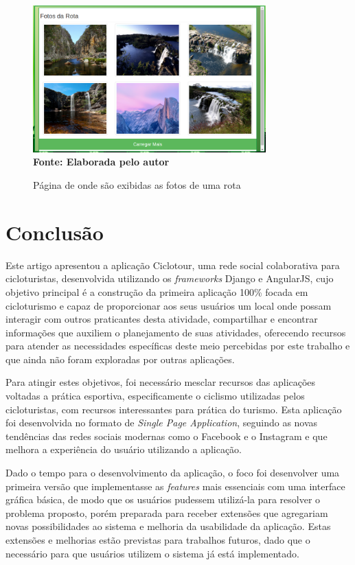 \begin{figure}[!ht]
	\centering	
	\caption[\hspace{0.1cm} Fotos da Rota.]
	{Página de onde são exibidas as fotos de uma rota}
	  \vspace{-0.4cm}
	\includegraphics[width=0.8\textwidth]{figuras/fotosRota.png}
	 \vspace{0cm}
	\\\textbf{\footnotesize Fonte: Elaborada pelo autor}
	\label{fig:fotosRota}
\end{figure}

\section{\esp Conclusão}
Este artigo apresentou a aplicação Ciclotour, uma rede social colaborativa para cicloturistas, desenvolvida utilizando os \textit{frameworks} Django 
e AngularJS, cujo objetivo principal é a construção da primeira aplicação 100\% focada em cicloturismo e 
capaz de proporcionar aos seus usuários um local onde 
possam interagir com outros praticantes desta atividade, compartilhar e encontrar informações que auxiliem o planejamento de suas atividades, 
oferecendo recursos para atender as necessidades específicas deste meio percebidas por este trabalho e que ainda não foram exploradas por 
outras aplicações.

Para atingir estes objetivos, foi necessário mesclar recursos das aplicações voltadas a prática esportiva, especificamente o ciclismo utilizadas pelos
cicloturistas, com recursos interessantes para prática do turismo. Esta aplicação foi desenvolvida no formato de \textit{Single Page Application}, 
seguindo as novas tendências das redes sociais modernas como o Facebook e o Instagram e que melhora a experiência do usuário utilizando a aplicação.

Dado o tempo para o desenvolvimento da aplicação, o foco foi desenvolver uma primeira versão que implementasse as \textit{features} mais essenciais
com uma interface gráfica básica, de modo que os usuários pudessem utilizá-la para resolver o problema proposto, porém preparada para receber 
extensões que agregariam novas possibilidades ao sistema e melhoria da usabilidade da aplicação. Estas extensões e melhorias estão previstas 
para trabalhos futuros, dado que o necessário para que usuários utilizem o sistema já está implementado. 

